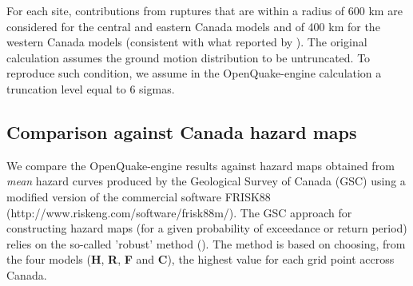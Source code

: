 For each site, contributions from ruptures that are within a radius of 600 km are considered for the central and eastern Canada models and of 400 km for the western Canada models (consistent with what reported by \cite{adams2003}). The original calculation assumes the ground motion distribution to be untruncated. To reproduce such condition, we assume in the OpenQuake-engine calculation a truncation level equal to 6 sigmas.

\subsection{Comparison against Canada hazard maps}
We compare the OpenQuake-engine results against hazard maps obtained from \textit{mean} hazard curves produced by the Geological Survey of Canada (GSC) using a modified version of the commercial software FRISK88 (http://www.riskeng.com/software/frisk88m/). The GSC approach for constructing hazard maps (for a given probability of exceedance or return period) relies on the so-called 'robust' method (\cite{adams2003}). The method is based on choosing, from the four models (\textbf{H}, \textbf{R}, \textbf{F} and \textbf{C}), the highest value for each grid point accross Canada.

